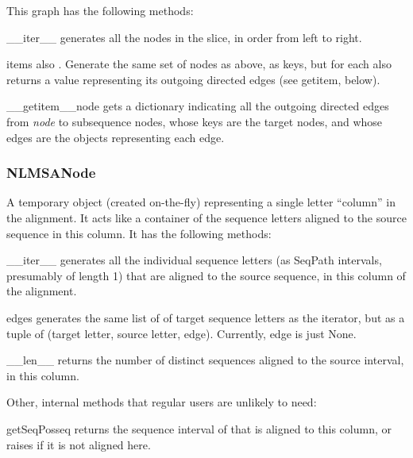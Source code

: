 \documentclass{howto}
\begin{document}
This graph has the following methods:

\begin{funcdesc}{__iter__}{}
  generates all the nodes in the slice, in order from left to right.
\end{funcdesc}

\begin{funcdesc}{items}{}
  also . Generate the same set of nodes as above,
  as keys, but for each also returns a value representing its outgoing
  directed edges (see getitem, below).
\end{funcdesc}

\begin{funcdesc}{__getitem__}{node}
  gets a dictionary indicating all the outgoing
  directed edges from {\em node} to subsequence nodes, whose keys are
  the target nodes, and whose edges are the 
   objects representing each edge.
\end{funcdesc}

\subsubsection{NLMSANode}
A temporary object (created on-the-fly) 
representing a single letter ``column'' in the alignment.  It acts like
a container of the sequence letters aligned to the source sequence in
this column.  It has the following methods:

\begin{funcdesc}{__iter__}{}
  generates all the individual sequence letters 
  (as SeqPath intervals, presumably of length 1) that are aligned to 
  the source sequence, in this column of the alignment.
\end{funcdesc}

    
\begin{funcdesc}{edges}{}
  generates the same list of of target sequence letters as
  the iterator, but as a tuple of (target letter, source letter, edge).
  Currently, edge is just None.
\end{funcdesc}

\begin{funcdesc}{__len__}{}
  returns the number of distinct sequences aligned to
  the source interval, in this column.
\end{funcdesc}

Other, internal methods that regular users are unlikely to need:

\begin{funcdesc}{getSeqPos}{seq}
  returns the sequence interval of 
  that is aligned to this column, or raises  if it is not
  aligned here.
\end{funcdesc}
\end{document}
